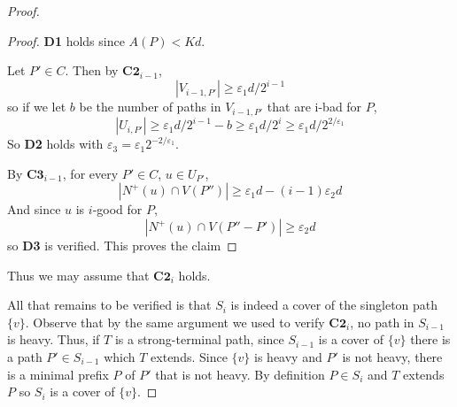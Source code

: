 \documentclass[10pt,a4paper]{amsart}
\newcommand{\vep}{\varepsilon}
\begin{document}
\begin{proof}
\begin{proof}
\medskip

\textbf{D1} holds since $A(P) < Kd$.

\medskip

Let $P' \in C$. Then by $\textbf{C2}_{i-1}$,
\[
|V_{i - 1, P'}| \geq \vep_1 d/2^{i - 1}
\]
so if we let $b$ be the number of paths in $V_{i - 1, P'}$ that are i-bad for $P$,
\[
|U_{i, P'}| \geq \vep_1 d/2^{i - 1} - b \geq \vep_1 d/2^i \geq \vep_1 d / 2^{2/\vep_1}
\]
So \textbf{D2} holds with $\vep_3 = \vep_1 2^{-2/\vep_1}$.

\medskip

By $\textbf{C3}_{i -1}$, for every $P' \in C$, $u \in U_{ P'}$,
\[
|N^+(u) \cap V(P'') | \geq \vep_1 d - (i - 1) \vep_2 d
\]
And since $u$ is $i$-good for $P$,
\[
|N^+(u) \cap V(P'' - P') | \geq \vep_2 d
\]
so \textbf{D3} is verified. This proves the claim
\end{proof}
Thus we may assume that $\textbf{C2}_i$ holds.

\medskip

All that remains to be verified is that $S_i$ is indeed a cover of the singleton path $\{v\}$. Observe that by the same argument we used to verify $\textbf{C2}_i$, no path in $S_{i - 1}$ is heavy. Thus, if $T$ is a strong-terminal path, since $S_{i - 1}$ is a cover of $\{v\}$ there is a path $P' \in S_{i - 1}$ which $T$ extends. Since $\{v\}$ is heavy and $P'$ is not heavy, there is a minimal prefix $P$ of $P'$ that is not heavy. By definition $P \in S_i$ and $T$ extends $P$ so $S_i$ is a cover of $\{v\}$.
\end{proof}
\end{document}

